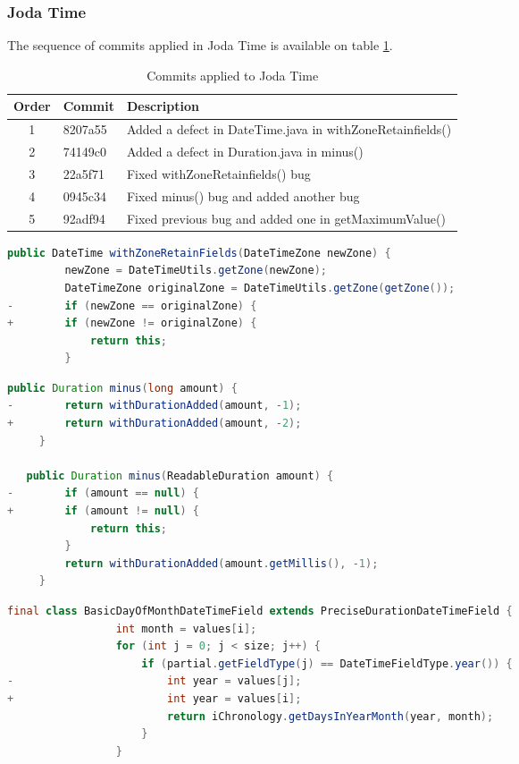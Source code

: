 \subsubsection{Joda Time}
The sequence of commits applied in Joda Time is available on table \ref{table:commits_jodatime}.
\begin{table}[H]
    \centering
    \caption{Commits applied to Joda Time}
    \label{table:commits_jodatime}
    \begin{tabular}{|c|l|l|}
        \hline
        Order & Commit & Description \\ \hline
        1 & 8207a55	& Added a defect in DateTime.java in withZoneRetainfields() \\ \hline
        2 & 74149c0 & Added a defect in Duration.java in minus() \\ \hline
        3 & 22a5f71 & Fixed withZoneRetainfields() bug \\ \hline
        4 & 0945c34 & Fixed minus() bug and added another bug \\ \hline
        5 & 92adf94 & Fixed previous bug and added one in getMaximumValue() \\ \hline
        
    \end{tabular}
\end{table}

\begin{lstlisting}[language=java, caption=Commit 8207a55 patch]
  public DateTime withZoneRetainFields(DateTimeZone newZone) {
         newZone = DateTimeUtils.getZone(newZone);
         DateTimeZone originalZone = DateTimeUtils.getZone(getZone());
-        if (newZone == originalZone) {
+        if (newZone != originalZone) {
             return this;
         }
\end{lstlisting}

\begin{lstlisting}[language=java, caption=Commit 74149c0 patch]
 public Duration minus(long amount) {
-        return withDurationAdded(amount, -1);
+        return withDurationAdded(amount, -2);
     }

   public Duration minus(ReadableDuration amount) {
-        if (amount == null) {
+        if (amount != null) {
             return this;
         }
         return withDurationAdded(amount.getMillis(), -1);
     }
\end{lstlisting}

\begin{lstlisting}[language=java, caption=Commit 92adf94 patch]
final class BasicDayOfMonthDateTimeField extends PreciseDurationDateTimeField {
                 int month = values[i];
                 for (int j = 0; j < size; j++) {
                     if (partial.getFieldType(j) == DateTimeFieldType.year()) {
-                        int year = values[j];
+                        int year = values[i];
                         return iChronology.getDaysInYearMonth(year, month);
                     }
                 }
\end{lstlisting}

